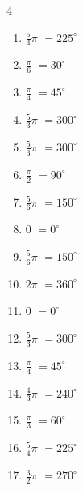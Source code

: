 \begin{multicols}{4}
\begin{enumerate}
  \item $\displaystyle \frac{5}{4}\pi$
        $\displaystyle =225^{\circ}$

  \item $\displaystyle \frac{\pi}{6}$
        $\displaystyle =30^{\circ}$

  \item $\displaystyle \frac{\pi}{4}$
        $\displaystyle =45^{\circ}$

  \item $\displaystyle \frac{5}{3}\pi$
        $\displaystyle =300^{\circ}$

  \item $\displaystyle \frac{5}{3}\pi$
        $\displaystyle =300^{\circ}$

  \item $\displaystyle \frac{\pi}{2}$
        $\displaystyle =90^{\circ}$

  \item $\displaystyle \frac{5}{6}\pi$
        $\displaystyle =150^{\circ}$

  \item $\displaystyle 0$
        $\displaystyle =0^{\circ}$

\columnbreak %

  \item $\displaystyle \frac{5}{6}\pi$
        $\displaystyle =150^{\circ}$

  \item $\displaystyle 2\pi$
        $\displaystyle =360^{\circ}$

  \item $\displaystyle 0$
        $\displaystyle =0^{\circ}$

  \item $\displaystyle \frac{5}{3}\pi$
        $\displaystyle =300^{\circ}$

  \item $\displaystyle \frac{\pi}{4}$
        $\displaystyle =45^{\circ}$

  \item $\displaystyle \frac{4}{3}\pi$
        $\displaystyle =240^{\circ}$

  \item $\displaystyle \frac{\pi}{3}$
        $\displaystyle =60^{\circ}$

  \item $\displaystyle \frac{5}{4}\pi$
        $\displaystyle =225^{\circ}$

  \item $\displaystyle \frac{3}{2}\pi$
        $\displaystyle =270^{\circ}$


\end{enumerate}
\end{multicols}
